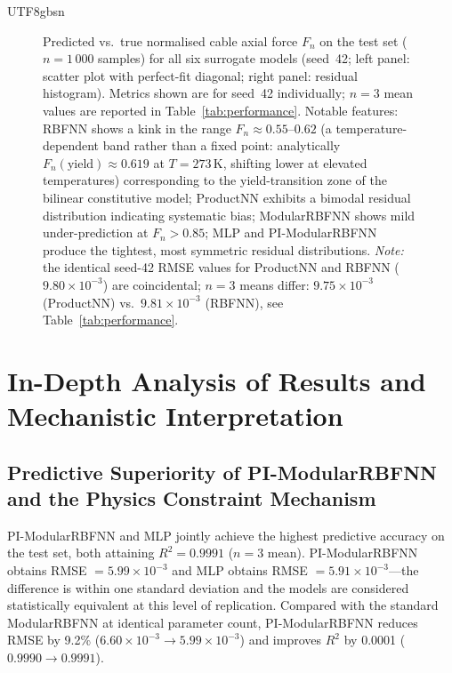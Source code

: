 \documentclass[a4paper,12pt]{report}
\begin{document}
\begin{CJK}{UTF8}{gbsn}
\begin{figure}[p]
\caption{Predicted vs.\ true normalised cable axial force $F_n$ on the test set
  ($n=1\,000$ samples) for all six surrogate models (seed~42; left panel: scatter
  plot with perfect-fit diagonal; right panel: residual histogram). Metrics shown
  are for seed~42 individually; $n=3$ mean values are reported in
  Table~\ref{tab:performance}. Notable features: RBFNN shows a kink in the range $F_n\approx0.55$--$0.62$ (a temperature-dependent
  band rather than a fixed point: analytically $F_n(\text{yield})\approx0.619$ at
  $T=273$\,K, shifting lower at elevated temperatures) corresponding to the
  yield-transition zone of the bilinear constitutive model; ProductNN exhibits a bimodal residual distribution indicating
  systematic bias; ModularRBFNN shows mild under-prediction at $F_n>0.85$;
  MLP and PI-ModularRBFNN produce the tightest, most symmetric residual distributions.
  \textit{Note:} the identical seed-42 RMSE values for ProductNN and RBFNN
  ($9.80\times10^{-3}$) are coincidental; $n{=}3$ means differ: $9.75\times10^{-3}$
  (ProductNN) vs.\ $9.81\times10^{-3}$ (RBFNN), see Table~\ref{tab:performance}.}
\label{fig:scatter_pred_true}
\end{figure}

\section{In-Depth Analysis of Results and Mechanistic Interpretation}
\label{sec:analysis}

\subsection{Predictive Superiority of PI-ModularRBFNN and the Physics Constraint Mechanism}
\label{subsec:pi_analysis}

PI-ModularRBFNN and MLP jointly achieve the highest predictive accuracy on the test set,
both attaining $R^2 = 0.9991$ ($n = 3$ mean). PI-ModularRBFNN obtains
RMSE $= 5.99 \times 10^{-3}$ and MLP obtains RMSE $= 5.91 \times 10^{-3}$---the
difference is within one standard deviation and the models are considered statistically
equivalent at this level of replication. Compared with the standard ModularRBFNN at
identical parameter count, PI-ModularRBFNN reduces RMSE by 9.2\%
($6.60 \times 10^{-3} \to 5.99 \times 10^{-3}$) and improves $R^2$ by 0.0001
($0.9990 \to 0.9991$).


\end{CJK}
\end{document}

